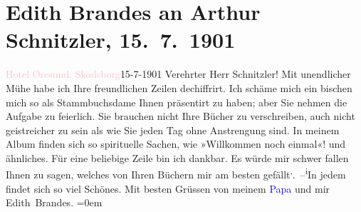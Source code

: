 

               \section[Edith Brandes an Arthur Schnitzler, 15. 7. 1901]{ Edith Brandes an Arthur Schnitzler, 15. 7. 1901}\nopagebreak{}\rehead{ }\normalsize\beginnumbering{} \toendnotes[C]{\smallbreak\pagebreak[2]} 
\toendnotes[C]{\smallbreak}\pstart
           \raggedleft{}{\pb}\textcolor{pink}{Hotel Øresund. Skodsborg}{}\ledrightnote{\textcolor{pink}{Hotel Øresund}}{\\}15-7-1901\pend
           \pstart\center{}Verehrter Herr Schnitzler!\pend\pstart
           Mit unendlicher Mühe habe ich Ihre freundlichen Zeilen dechiffrirt. Ich schäme
                    mich ein bischen mich so als Stammbuchsdame Ihnen präsentirt zu haben; aber Sie
                    nehmen die Aufgabe {\pb}zu
                    feierlich. Sie brauchen nicht Ihre Bücher zu verschreiben, auch nicht
                    geistreicher zu sein als wie Sie jeden Tag ohne Anstrengung sind. In meinem
                    Album finden sich so spirituelle Sachen, wie »Willkommen noch einmal«! und
                    ähnliches. Für eine beliebige Zeile bin ich dankbar. Es würde mir schwer fallen
                    Ihnen zu sagen, welches von Ihren Büchern mir am besten gefällt\substVorne{}\textsuperscript{,}\substDazwischen{}. –\substHinten{}{ }\substVorne{}\textsuperscript{i}\substDazwischen{}I\substHinten{}n jedem findet sich so viel Schönes.\pend
           \pstart
           {\pb}Mit besten Grüssen von
                    meinem \textcolor{blue}{Papa}{} und mir{\\[\baselineskip]}\spacefill\mbox{Edith Brandes.}\pend
           \leftskip=0em{}\endnumbering{}  
      